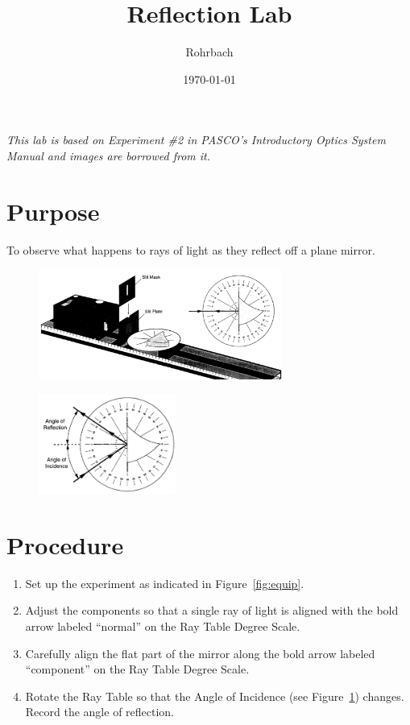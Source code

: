 \documentclass[10pt]{exam}
\title{Reflection Lab}
\author{Rohrbach}
\date{\today}
\begin{document}
\maketitle

\noindent
{\small \it This lab is based on Experiment \#2 in PASCO's Introductory Optics System Manual and images are borrowed from it.}

\section*{Purpose} To observe what happens to rays of light as they reflect off a plane mirror.

\noindent
\begin{figure}[h]
  \centering
  \begin{minipage}[b]{10cm}
    \centering
    \includegraphics[width=8cm]{Fig2_1.png}
    \label{fig:equip}
  \end{minipage}%
  \begin{minipage}[b]{6cm}
    \centering
    \includegraphics[width=4.5cm]{Fig2_2.png}
    \label{fig:rays}
  \end{minipage}
\end{figure}

\vspace{-1em}

\section*{Procedure}
\begin{enumerate}
  \item Set up the experiment as indicated in Figure~\ref{fig:equip}.
  \item Adjust the components so that a single ray of light is aligned with the bold arrow labeled “normal” on the Ray Table Degree Scale.
  \item Carefully align the flat part of the mirror along the bold arrow labeled “component” on the Ray Table Degree Scale.
  \item Rotate the Ray Table so that the Angle of Incidence (see Figure~\ref{fig:rays}) changes.  Record the angle of reflection.
  
\end{enumerate}
\end{document}
